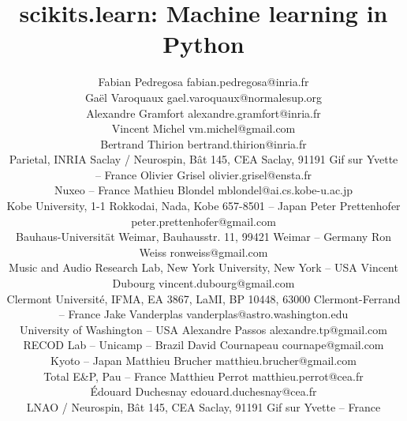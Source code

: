 \documentclass[twoside,11pt]{article}
\begin{document}
\title{scikits.learn: Machine learning in Python}


\author{\name Fabian Pedregosa \email fabian.pedregosa@inria.fr \\
        \name Ga\"el Varoquaux \email gael.varoquaux@normalesup.org  \\
        \name Alexandre Gramfort \email alexandre.gramfort@inria.fr \\
        \name Vincent Michel  \email vm.michel@gmail.com \\
        \name Bertrand Thirion  \email bertrand.thirion@inria.fr \\
        \addr Parietal, INRIA Saclay / Neurospin,
      B\^at 145, CEA Saclay, 91191 Gif sur Yvette -- {\sc France}
        \AND
        \name Olivier Grisel \email olivier.grisel@ensta.fr \\
        \addr Nuxeo -- {\sc France}
        \AND
        \name Mathieu Blondel \email mblondel@ai.cs.kobe-u.ac.jp \\
        \addr Kobe University, 1-1 Rokkodai, Nada, Kobe 657-8501 -- {\sc Japan}
        \AND
        \name Peter Prettenhofer \email peter.prettenhofer@gmail.com \\
        \addr Bauhaus-Universit\"at Weimar, Bauhausstr. 11, 99421 Weimar -- {\sc Germany}
        \AND
        \name Ron Weiss \email ronweiss@gmail.com \\
        \addr Music and Audio Research Lab, New York University, New York -- {\sc USA}
        \AND
        \name Vincent Dubourg \email vincent.dubourg@gmail.com\\
        \addr Clermont Universit\'e, IFMA, EA 3867, LaMI,
        BP 10448, 63000 Clermont-Ferrand -- {\sc France}
        \AND
        \name Jake Vanderplas \email vanderplas@astro.washington.edu\\
        \addr University of Washington -- {\sc USA}
  \AND
        \name Alexandre Passos \email alexandre.tp@gmail.com \\
        \addr RECOD Lab -- Unicamp -- {\sc Brazil}
        \AND
        \name David Cournapeau \email cournape@gmail.com \\
        \addr Kyoto -- {\sc Japan}
        \AND
        \name Matthieu Brucher \email matthieu.brucher@gmail.com \\
        \addr Total E\&P,  Pau -- {\sc France}
        \AND
        \name Matthieu Perrot \email matthieu.perrot@cea.fr\\
        \name \'Edouard Duchesnay \email edouard.duchesnay@cea.fr \\
        \addr LNAO / Neurospin,
      B\^at 145, CEA Saclay, 91191 Gif sur Yvette -- {\sc France}
}
\end{document}

